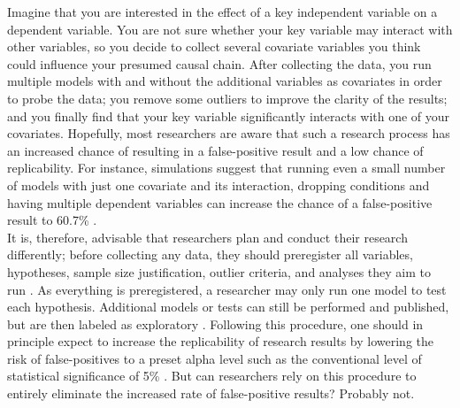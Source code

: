 Imagine that you are interested in the effect of a key independent variable on a dependent variable. You are not sure whether your key variable may interact with other variables, so you decide to collect several covariate variables you think could influence your presumed causal chain. After collecting the data, you run multiple models with and without the additional variables as covariates in order to probe the data; you remove some outliers to improve the clarity of the results; and you finally find that your key variable significantly interacts with one of your covariates. Hopefully, most researchers are aware that such a research process has an increased chance of resulting in a false-positive result and a low chance of replicability. For instance, simulations suggest that running even a small number of models with just one covariate and its interaction, dropping conditions and having multiple dependent variables can increase the chance of a false-positive result to 60.7\% \citep{Simmons2011}.\\

It is, therefore, advisable that researchers plan and conduct their research differently; before collecting any data, they should preregister all variables, hypotheses, sample size justification, outlier criteria, and analyses they aim to run \citep{Pham2020, Simmons2020, VANTVEER20162}. As everything is preregistered, a researcher may only run one model to test each hypothesis. Additional models or tests can still be performed and published, but are then labeled as exploratory \citep{Nosek2018}. Following this procedure, one should in principle expect to increase the replicability of research results by lowering the risk of false-positives to a preset alpha level such as the conventional level of statistical significance of 5\% \citep{Moore2016}. But can researchers rely on this procedure to entirely eliminate the increased rate of false-positive results? Probably not. \\

